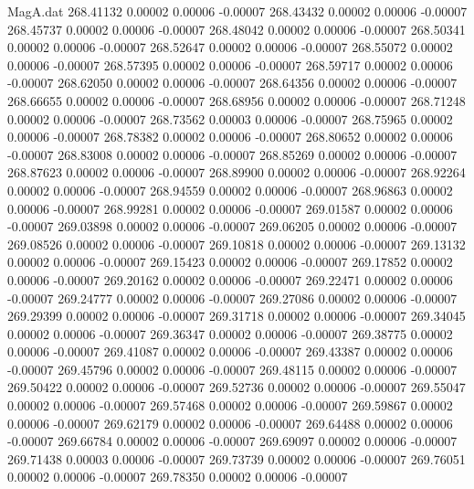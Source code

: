 \begin{filecontents}{MagA.dat}
 268.41132    0.00002    0.00006   -0.00007
 268.43432    0.00002    0.00006   -0.00007
 268.45737    0.00002    0.00006   -0.00007
 268.48042    0.00002    0.00006   -0.00007
 268.50341    0.00002    0.00006   -0.00007
 268.52647    0.00002    0.00006   -0.00007
 268.55072    0.00002    0.00006   -0.00007
 268.57395    0.00002    0.00006   -0.00007
 268.59717    0.00002    0.00006   -0.00007
 268.62050    0.00002    0.00006   -0.00007
 268.64356    0.00002    0.00006   -0.00007
 268.66655    0.00002    0.00006   -0.00007
 268.68956    0.00002    0.00006   -0.00007
 268.71248    0.00002    0.00006   -0.00007
 268.73562    0.00003    0.00006   -0.00007
 268.75965    0.00002    0.00006   -0.00007
 268.78382    0.00002    0.00006   -0.00007
 268.80652    0.00002    0.00006   -0.00007
 268.83008    0.00002    0.00006   -0.00007
 268.85269    0.00002    0.00006   -0.00007
 268.87623    0.00002    0.00006   -0.00007
 268.89900    0.00002    0.00006   -0.00007
 268.92264    0.00002    0.00006   -0.00007
 268.94559    0.00002    0.00006   -0.00007
 268.96863    0.00002    0.00006   -0.00007
 268.99281    0.00002    0.00006   -0.00007
 269.01587    0.00002    0.00006   -0.00007
 269.03898    0.00002    0.00006   -0.00007
 269.06205    0.00002    0.00006   -0.00007
 269.08526    0.00002    0.00006   -0.00007
 269.10818    0.00002    0.00006   -0.00007
 269.13132    0.00002    0.00006   -0.00007
 269.15423    0.00002    0.00006   -0.00007
 269.17852    0.00002    0.00006   -0.00007
 269.20162    0.00002    0.00006   -0.00007
 269.22471    0.00002    0.00006   -0.00007
 269.24777    0.00002    0.00006   -0.00007
 269.27086    0.00002    0.00006   -0.00007
 269.29399    0.00002    0.00006   -0.00007
 269.31718    0.00002    0.00006   -0.00007
 269.34045    0.00002    0.00006   -0.00007
 269.36347    0.00002    0.00006   -0.00007
 269.38775    0.00002    0.00006   -0.00007
 269.41087    0.00002    0.00006   -0.00007
 269.43387    0.00002    0.00006   -0.00007
 269.45796    0.00002    0.00006   -0.00007
 269.48115    0.00002    0.00006   -0.00007
 269.50422    0.00002    0.00006   -0.00007
 269.52736    0.00002    0.00006   -0.00007
 269.55047    0.00002    0.00006   -0.00007
 269.57468    0.00002    0.00006   -0.00007
 269.59867    0.00002    0.00006   -0.00007
 269.62179    0.00002    0.00006   -0.00007
 269.64488    0.00002    0.00006   -0.00007
 269.66784    0.00002    0.00006   -0.00007
 269.69097    0.00002    0.00006   -0.00007
 269.71438    0.00003    0.00006   -0.00007
 269.73739    0.00002    0.00006   -0.00007
 269.76051    0.00002    0.00006   -0.00007
 269.78350    0.00002    0.00006   -0.00007

\end{filecontents}
